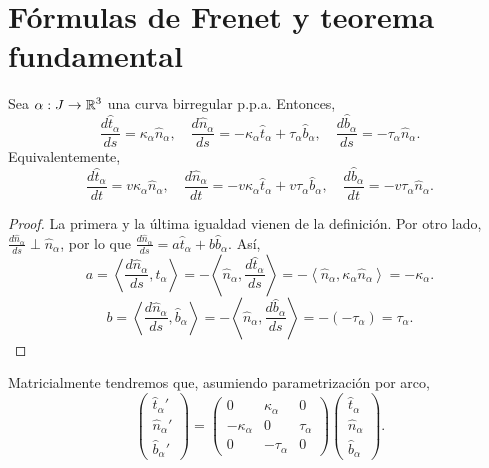 \section{Fórmulas de Frenet y teorema fundamental}
\begin{theorem}
Sea $\displaystyle \alpha : J \to \mathbb{R}^{3} $ una curva birregular p.p.a. Entonces,
\[\frac{d\hat{t}_{\alpha }}{d s}=\kappa_{\alpha }\hat{n}_{\alpha }, \quad \frac{d\hat{n}_{\alpha }}{d s}=-\kappa_{\alpha }\hat{t}_{\alpha } + \tau_{\alpha }\hat{b}_{\alpha }, \quad \frac{d\hat{b}_{\alpha }}{d s}=-\tau_{\alpha }\hat{n}_{\alpha } .\]
Equivalentemente, 
\[\frac{d\hat{t}_{\alpha }}{d t}=v\kappa_{\alpha }\hat{n}_{\alpha }, \quad \frac{d\hat{n}_{\alpha }}{d t}=-v\kappa_{\alpha }\hat{t}_{\alpha } + v\tau_{\alpha }\hat{b}_{\alpha }, \quad \frac{d\hat{b}_{\alpha }}{d t}=-v\tau_{\alpha }\hat{n}_{\alpha } .\]
\end{theorem}
\begin{proof}
La primera y la última igualdad vienen de la definición. Por otro lado, $\displaystyle \frac{d\hat{n}_{\alpha }}{d s}\perp \hat{n}_{\alpha } $, por lo que $\displaystyle \frac{d\hat{n}_{\alpha }}{d s }=a\hat{t}_{\alpha } + b\hat{b}_{\alpha } $. Así, 
\[a = \left\langle \frac{d\hat{n}_{\alpha }}{d s}, \hat{t}_{\alpha } \right\rangle =-\left\langle \hat{n}_{\alpha }, \frac{d\hat{t}_{\alpha }}{d s} \right\rangle =-\left\langle \hat{n}_{\alpha }, \kappa_{\alpha }\hat{n}_{\alpha } \right\rangle =-\kappa_{\alpha} .\]
\[ b = \left\langle \frac{d\hat{n}_{\alpha }}{d s}, \hat{b}_{\alpha } \right\rangle = - \left\langle \hat{n}_{\alpha }, \frac{d\hat{b}_{\alpha }}{d s} \right\rangle =-\left(-\tau_{\alpha}\right)=\tau_{\alpha} .\]
\end{proof}

\begin{observation}
Matricialmente tendremos que, asumiendo parametrización por arco,
\[\begin{pmatrix} \hat{t}_{\alpha }' \\ \hat{n}_{\alpha }'\\ \hat{b}_{\alpha }' \end{pmatrix}=\begin{pmatrix} 0 & \kappa_{\alpha } & 0 \\ -\kappa_{\alpha } & 0 & \tau_{\alpha }\\0 & -\tau_{\alpha }& 0 \end{pmatrix}\begin{pmatrix} \hat{t}_{\alpha } \\ \hat{n}_{\alpha } \\ \hat{b}_{\alpha } \end{pmatrix} .\]
\end{observation}

